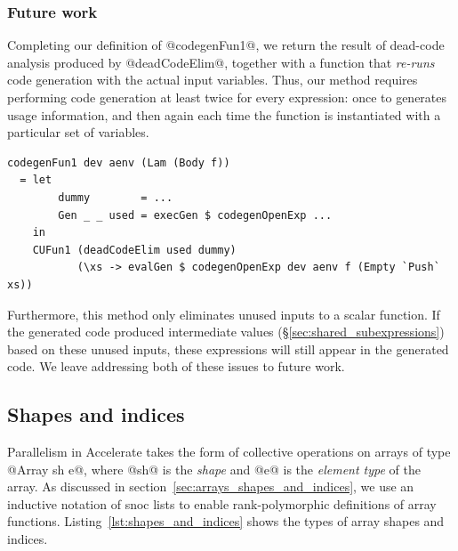 \subsubsection{Future work}

Completing our definition of @codegenFun1@, we return the result of
dead-code analysis produced by @deadCodeElim@, together with a function
that \emph{re-runs} code generation with the actual input variables. Thus, our
method requires performing code generation at least twice for every expression:
once to generates usage information, and then again each time the function is
instantiated with a particular set of variables.
%
\begin{lstlisting}[style=haskell,firstnumber=7]
codegenFun1 dev aenv (Lam (Body f))
  = let
        dummy        = ...
        Gen _ _ used = execGen $ codegenOpenExp ...
    in
    CUFun1 (deadCodeElim used dummy)
           (\xs -> evalGen $ codegenOpenExp dev aenv f (Empty `Push` xs))
\end{lstlisting}

Furthermore, this method only eliminates unused inputs to a scalar function. If
the generated code produced intermediate values
(\S\ref{sec:shared_subexpressions}) based on these unused inputs, these
expressions will still appear in the generated code. We leave addressing both of
these issues to future work.


\subsection{Shapes and indices}

Parallelism in Accelerate takes the form of collective operations on arrays of
type @Array sh e@, where @sh@ is the \emph{shape} and @e@ is the \emph{element
type} of the array. As discussed in section~\ref{sec:arrays_shapes_and_indices},
we use an inductive notation of snoc lists to enable rank-polymorphic
definitions of array functions. Listing~\ref{lst:shapes_and_indices} shows the
types of array shapes and indices.

